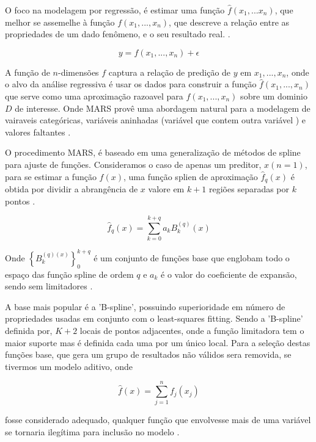 \documentclass[
	12pt,				%
	openright,			%
	oneside,			%
	a4paper,			%
	english,			%
	brazil				%
	]{abntex2}
\begin{document}
O foco na modelagem por regressão, é estimar uma função $\hat{f}(x_1,...x_n)$, que melhor se assemelhe à função 
$f(x_1,...,x_n)$, que descreve a relação entre as propriedades de um dado fenômeno, e o seu resultado real.
\cite{MARS}. 

\begin{equation}
	\label{mars_eq_base}
	y = f(x_1,...,x_n) + \epsilon
\end{equation}

A função de $n$-dimensões $f$ captura a relação de predição de $y$ em $x_1,...,x_n$, onde o alvo da análise regressiva
é usar os dados para construir a função $\hat{f}(x_1,...,x_n)$ que serve como uma aproximação razoavel para
$f(x_1,...,x_n)$ sobre um dominio $D$ de interesse. Onde MARS provê uma abordagem natural para a modelagem de vairaveis
categóricas, variáveis aninhadas (variável que contem outra variável ) e valores faltantes \cite{intro_mars}.

O procedimento MARS, é baseado em uma generalização de métodos de spline para ajuste de funções. Consideramos o caso de
apenas um preditor, $x (n = 1)$, para se estimar a função $f(x)$, uma função splien de aproximação $\hat{f}_q(x)$ é obtida por
dividir a abrangência de $x$ valore em $k+1$ regiões separadas por $k$ pontos \cite{intro_mars}.

\begin{equation}
	\label{funcao_spline_aproximacao}
	\hat{f}_q(x) = \sum_{k=0}^{k+q}a_kB_k^{(q)}(x)
\end{equation}

Onde $\left\{B_k^{(q)(x)}\right\}_{0}^{k+q}$ é um conjunto de funções base que englobam todo o espaço das função spline de ordem $q$ e $a_k$ é o
valor do coeficiente de expansão, sendo sem limitadores \cite{intro_mars}.

A base mais popular é a 'B-spline', possuindo superioridade em número de propriedades usadas em conjunto com o least-squares 
fitting. Sendo a 'B-spline' definida por, $K+2$ locais de pontos adjacentes, onde a função limitadora tem o maior suporte
mas é definida cada uma por um único local. Para a seleção destas funções base, que gera um grupo de resultados
não válidos sera removida, se tivermos um modelo aditivo, onde

\begin{equation}
	\hat{f}(x) = \sum_{j=1}^{n}f_j(x_j)
\end{equation}

fosse considerado adequado, qualquer função que envolvesse mais de uma variável se tornaria ilegítima para inclusão no modelo \cite{intro_mars}.
\end{document}
